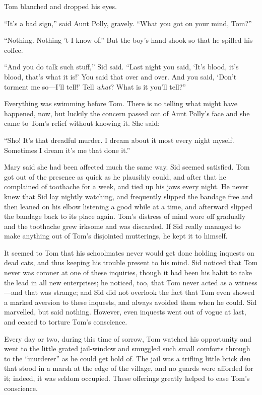 \documentclass{book}
\begin{document}
Tom blanched and dropped his eyes.

“It’s a bad sign,” said Aunt Polly, gravely. “What you got on your mind, Tom?”

“Nothing. Nothing ’t I know of.” But the boy’s hand shook so that he spilled his coffee.

“And you do talk such stuff,” Sid said. “Last night you said, ‘It’s blood, it’s blood, that’s what it is!’ You said that over and over. And you said, ‘Don’t torment me so—I’ll tell!’ Tell \emph{what}? What is it you’ll tell?”

Everything was swimming before Tom. There is no telling what might have happened, now, but luckily the concern passed out of Aunt Polly’s face and she came to Tom’s relief without knowing it. She said:

“Sho! It’s that dreadful murder. I dream about it most every night myself. Sometimes I dream it’s me that done it.”

Mary said she had been affected much the same way. Sid seemed satisfied. Tom got out of the presence as quick as he plausibly could, and after that he complained of toothache for a week, and tied up his jaws every night. He never knew that Sid lay nightly watching, and frequently slipped the bandage free and then leaned on his elbow listening a good while at a time, and afterward slipped the bandage back to its place again. Tom’s distress of mind wore off gradually and the toothache grew irksome and was discarded. If Sid really managed to make anything out of Tom’s disjointed mutterings, he kept it to himself.

It seemed to Tom that his schoolmates never would get done holding inquests on dead cats, and thus keeping his trouble present to his mind. Sid noticed that Tom never was coroner at one of these inquiries, though it had been his habit to take the lead in all new enterprises; he noticed, too, that Tom never acted as a witness—and that was strange; and Sid did not overlook the fact that Tom even showed a marked aversion to these inquests, and always avoided them when he could. Sid marvelled, but said nothing. However, even inquests went out of vogue at last, and ceased to torture Tom’s conscience.

Every day or two, during this time of sorrow, Tom watched his opportunity and went to the little grated jail-window and smuggled such small comforts through to the “murderer” as he could get hold of. The jail was a trifling little brick den that stood in a marsh at the edge of the village, and no guards were afforded for it; indeed, it was seldom occupied. These offerings greatly helped to ease Tom’s conscience.
\end{document}
